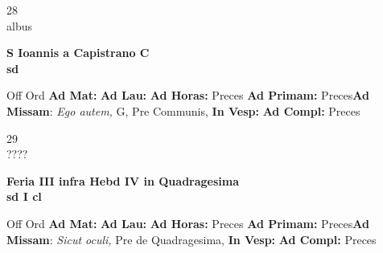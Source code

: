 \documentclass[10pt, openany]{book}
\begin{document}
    \begin{center}
        \begin{minipage}{3.5in}
            \vspace{2em}
            \begin{minipage}{0.5in}
                {\Huge 28} \\
                {\normalsize albus}
            \end{minipage}
            \begin{minipage}{3.0in}
                \textbf{ \large S Ioannis a Capistrano C \\
                \textnormal{\normalsize sd}}

            \end{minipage}
            \begin{justify}Off Ord
                \textbf{Ad Mat: }
                \textbf{Ad Lau: }
                \textbf{Ad Horas: }Preces
                \textbf{Ad Primam: }Preces\textbf{Ad Missam}: \textit{Ego autem,} G, Pre Communis, 
                \textbf{In Vesp: }
                \textbf{Ad Compl: }Preces
            \end{justify}
        \end{minipage}
    \end{center}

    \begin{center}
        \begin{minipage}{3.5in}
            \vspace{2em}
            \begin{minipage}{0.5in}
                {\Huge 29} \\
                {\normalsize ????}
            \end{minipage}
            \begin{minipage}{3.0in}
                \textbf{ \large Feria III infra Hebd IV in Quadragesima  \\
                \textnormal{\normalsize sd I cl}}

            \end{minipage}
            \begin{justify}Off Ord
                \textbf{Ad Mat: }
                \textbf{Ad Lau: }
                \textbf{Ad Horas: }Preces
                \textbf{Ad Primam: }Preces\textbf{Ad Missam}: \textit{Sicut oculi,} Pre de Quadragesima, 
                \textbf{In Vesp: }
                \textbf{Ad Compl: }Preces
            \end{justify}
        \end{minipage}
    \end{center}
\end{document}
